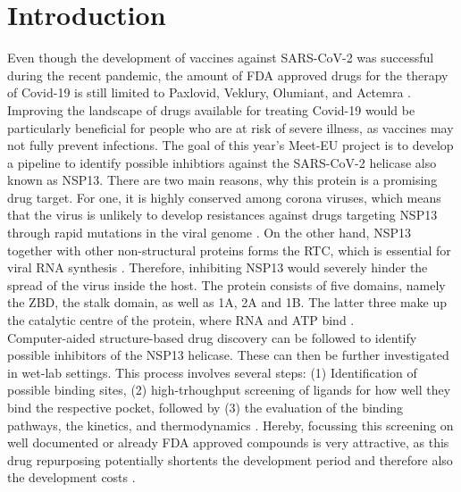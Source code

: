 \documentclass[11pt, letterpaper, titlepage]{article}
\renewcommand{\cite}{\parencite}
\begin{document}
\section{Introduction}
Even though the development of vaccines against SARS-CoV-2 was successful during the recent pandemic, the amount of FDA approved drugs for the therapy of Covid-19 is still limited to Paxlovid, Veklury, Olumiant, and Actemra \cite{FDA_COVID}. Improving the landscape of drugs available for treating Covid-19 would be particularly beneficial for people who are at risk of severe illness, as vaccines may not fully prevent infections. The goal of this year's Meet-EU project is to develop a pipeline to identify possible inhibtiors against the SARS-CoV-2 helicase also known as \ac{NSP13}. There are two main reasons, why this protein is a promising drug target. For one, it is highly conserved among corona viruses, which means that the virus is unlikely to develop resistances against drugs targeting \ac{NSP13} through rapid mutations in the viral genome \cite{Spratt_2021}. 
On the other hand, \ac{NSP13} together with other non-structural proteins forms the \ac{RTC}, which is essential for viral RNA synthesis \cite{Malone_2022}. Therefore, inhibiting \ac{NSP13} would severely hinder the spread of the virus inside the host. 
The protein consists of five domains, namely the \ac{ZBD}, the stalk domain, as well as 1A, 2A and 1B. The latter three make up the catalytic centre of the protein, where RNA and ATP bind \cite{NSP13_basics}. \\
Computer-aided structure-based drug discovery can be followed to identify possible inhibitors of the \ac{NSP13} helicase. These can then be further investigated in wet-lab settings. This process involves several steps: (1) Identification of possible binding sites, (2) high-trhoughput screening of ligands for how well they bind the respective pocket, followed by (3) the evaluation of the binding pathways, the kinetics, and thermodynamics \cite{Sledz_2018}. Hereby, focussing this screening on well documented or already FDA approved compounds is very attractive, as this drug repurposing potentially shortents the development period and therefore also the development costs \cite{Pushpakom_2019}. 

\end{document}
